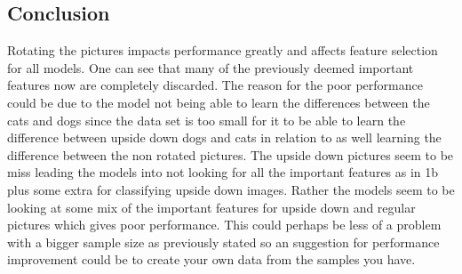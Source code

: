 \documentclass{article}
\begin{document}
\subsection{Conclusion}
Rotating the pictures impacts performance greatly and affects feature selection for all models. One can see that many of the previously deemed important features now are completely discarded. The reason for the poor performance could be due to the model not being able to learn the differences between the cats and dogs since the data set is too small for it to be able to learn the difference between upside down dogs and cats in relation to as well learning the difference between the non rotated pictures. The upside down pictures seem to be miss leading the models into not looking for all the important features as in 1b plus some extra for classifying upside down images. Rather the models seem to be looking at some mix of the important features for upside down and regular pictures which gives poor performance. This could perhaps be less of a problem with a bigger sample size as previously stated so an suggestion for performance improvement could be to create your own data from the samples you have.  
\end{document}
